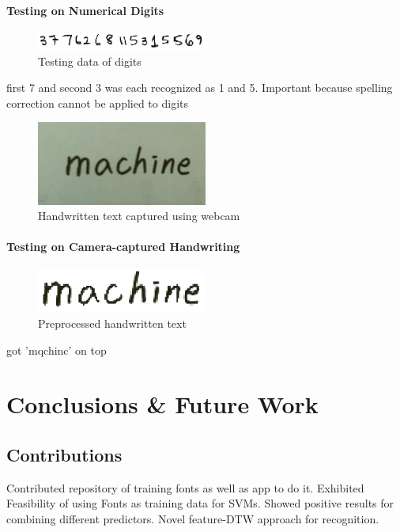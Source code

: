 \documentclass[12pt]{article}
\begin{document}
	
	\paragraph{Testing on Numerical Digits}
	\begin{figure}[htbp!]
	\centering
	\includegraphics[width=0.5\textwidth]{number.eps}
	\caption{Testing data of digits}
	\label{figure:number}
	\end{figure}
	first 7 and second 3 was each recognized as 1 and 5.
	Important because spelling correction cannot be applied to digits
	
	
	\begin{figure}[htbp!]
	\centering
	\includegraphics[width=0.5\textwidth]{machine_camb.eps}
	\caption{Handwritten text captured using webcam}
	\label{figure:machine_camb}
	\end{figure}
	
	\paragraph{Testing on Camera-captured Handwriting}
	
	\begin{figure}[htbp!]
	\centering
	\includegraphics[width=0.5\textwidth]{machine_cam.eps}
	\caption{Preprocessed handwritten text}
	\label{figure:machine_cam}
	\end{figure}
	got 'mqchinc' on top
	
\section{Conclusions \& Future Work}
\label{section:conclusion}
	\subsection{Contributions}
	Contributed repository of training fonts as well as app to do it.
	Exhibited Feasibility of using Fonts as training data for SVMs.
	Showed positive results for combining different predictors.
	Novel feature-DTW approach for recognition.
\end{document}
